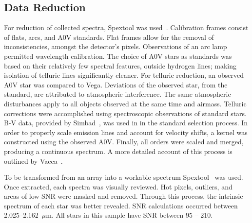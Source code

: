 \subsection{Data Reduction}

For reduction of collected spectra, Spextool was used~\cite{Cushing_2004}. 
Calibration frames consist of flats, arcs, and A0V standards.  Flat frames allow for the removal of inconsistencies, amongst the detector's pixels.  Observations of an arc lamp permitted wavelength calibration.  The choice of A0V stars as standards was based on their relatively few spectral features, outside hydrogen lines; making isolation of telluric lines significantly cleaner.  
For telluric reduction, an observed A0V star was compared to Vega.  Deviations of the observed star, from the standard, are attributed to atmospheric interference.  The same atmospheric disturbances apply to all objects observed at the same time and airmass.  Telluric corrections were accomplished using spectroscopic observations of standard stars. B-V data, provided by Simbad~\cite{simbad}, was used in in the standard selection process.
In order to properly scale emission lines and account for velocity shifts, a kernel was constructed using the observed A0V.  Finally, all orders were scaled and merged, producing a continuous spectrum.
A more detailed account of this process is outlined by Vacca~\cite{Vacca_2003}.  



To be transformed from an array into a workable spectrum Spextool~\cite{Cushing_2004} was used.  Once extracted, each spectra was visually reviewed.  Hot pixels, outliers, and areas of low SNR were masked and removed.  Through this process, the intrinsic spectrum of each star was better revealed.  SNR calculations occurred between 2.025--2.162~$\mu$m.  All stars in this sample have SNR between 95 -- 210.

